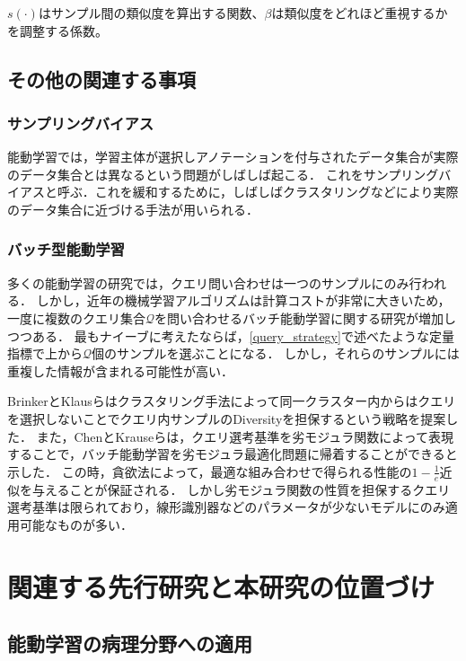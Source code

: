$s(\cdot)$はサンプル間の類似度を算出する関数、$\beta$は類似度をどれほど重視するかを調整する係数。

\subsection{その他の関連する事項}
\subsubsection{サンプリングバイアス}
能動学習では，学習主体が選択しアノテーションを付与されたデータ集合が実際のデータ集合とは異なるという問題がしばしば起こる．
これをサンプリングバイアスと呼ぶ．これを緩和するために，しばしばクラスタリングなどにより実際のデータ集合に近づける手法が用いられる．

\subsubsection{バッチ型能動学習}
多くの能動学習の研究では，クエリ問い合わせは一つのサンプルにのみ行われる．
しかし，近年の機械学習アルゴリズムは計算コストが非常に大きいため，一度に複数のクエリ集合$\mathcal{Q}$を問い合わせるバッチ能動学習に関する研究が増加しつつある．
最もナイーブに考えたならば，\ref{query_strategy}で述べたような定量指標で上から$\mathcal{Q}$個のサンプルを選ぶことになる．
しかし，それらのサンプルには重複した情報が含まれる可能性が高い．

BrinkerとKlausらはクラスタリング手法によって同一クラスター内からはクエリを選択しないことでクエリ内サンプルのDiversityを担保するという戦略を提案した\cite{brinker2003incorporating}．
また，ChenとKrauseらは，クエリ選考基準を劣モジュラ関数によって表現することで，バッチ能動学習を劣モジュラ最適化問題に帰着することができると示した\cite{chen2013near}．
この時，貪欲法によって，最適な組み合わせで得られる性能の$1 - \frac{1}{e}$近似を与えることが保証される．
しかし劣モジュラ関数の性質を担保するクエリ選考基準は限られており，線形識別器などのパラメータが少ないモデルにのみ適用可能なものが多い．

\section{関連する先行研究と本研究の位置づけ}

\subsection{能動学習の病理分野への適用}

